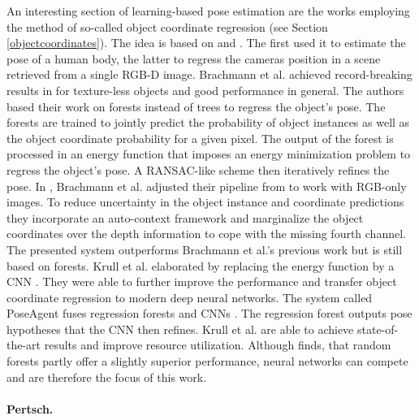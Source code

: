An interesting section of learning-based pose estimation are the works employing the method of so-called object coordinate regression (see Section \ref{objectcoordinates}). The idea is based on \cite{tsharp} and \cite{firstcoordinateregression}. The first used it to estimate the pose of a human body, the latter to regress the cameras position in a scene retrieved from a single RGB-D image.
\nnewline
Brachmann et al. achieved record-breaking results in \cite{brachmann1} for texture-less objects and good performance in general. The authors based their work on forests instead of trees to regress the object's pose. The forests are trained to jointly predict the probability of object instances as well as the object coordinate probability for a given pixel. The output of the forest is processed in an energy function that imposes an energy minimization problem to regress the object's pose. A RANSAC-like scheme then iteratively refines the pose.
\nnewline
In \cite{brachmann2}, Brachmann et al. adjusted their pipeline from \cite{brachmann1} to work with RGB-only images. To reduce uncertainty in the object instance and coordinate predictions they incorporate an auto-context framework and marginalize the object coordinates over the depth information to cope with the missing fourth channel. The presented system outperforms Brachmann et al.'s previous work but is still based on forests. 
\nnewline
Krull et al. elaborated \cite{brachmann1} by replacing the energy function by a CNN \cite{akrull}. They were able to further improve the performance and transfer object coordinate regression to modern deep neural networks. The system called PoseAgent fuses regression forests and CNNs \cite{poseagent}. The regression forest outputs pose hypotheses that the CNN then refines. Krull et al. are able to achieve state-of-the-art results and improve resource utilization. Although \cite{trees-vs-cnn} finds, that random forests partly offer a slightly superior performance, neural networks can compete and are therefore the focus of this work.

\paragraph{Pertsch.}

